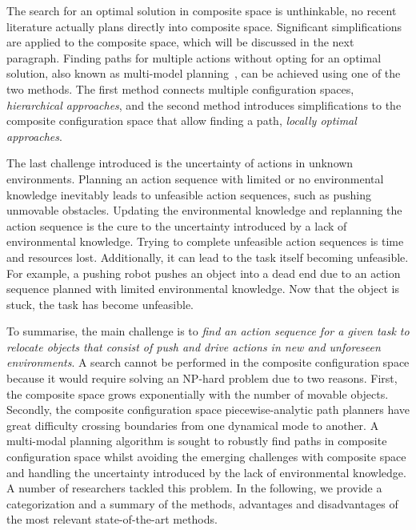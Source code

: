 The search for an optimal solution in composite space is unthinkable, no recent literature actually plans directly into composite space. Significant simplifications are applied to the composite space, which will be discussed in the next paragraph. Finding paths for multiple actions without opting for an optimal solution, also known as multi-model planning~\cite{hauser_multimodal_2010}, can be achieved using one of the two methods. The first method connects multiple configuration spaces, \textit{hierarchical approaches}, and the second method introduces simplifications to the composite configuration space that allow finding a path, \textit{locally optimal approaches}.\bs

The last challenge introduced is the uncertainty of actions in unknown environments. Planning an action sequence with limited or no environmental knowledge inevitably leads to unfeasible action sequences, such as pushing unmovable obstacles. Updating the environmental knowledge and replanning the action sequence is the cure to the uncertainty introduced by a lack of environmental knowledge. Trying to complete unfeasible action sequences is time and resources lost. Additionally, it can lead to the task itself becoming unfeasible. For example, a pushing robot pushes an object into a dead end due to an action sequence planned with limited environmental knowledge. Now that the object is stuck, the task has become unfeasible.\bs

To summarise, the main challenge is to \textit{find an action sequence for a given task to relocate objects that consist of push and drive actions in new and unforeseen environments}. A search cannot be performed in the composite configuration space because it would require solving an \ac{NP-hard} problem due to two reasons. First, the composite space grows exponentially with the number of movable objects. Secondly, the composite configuration space piecewise-analytic path planners have great difficulty crossing boundaries from one dynamical mode to another. A multi-modal planning algorithm is sought to robustly find paths in composite configuration space whilst avoiding the emerging challenges with composite space and handling the uncertainty introduced by the lack of environmental knowledge. A number of researchers tackled this problem. In the following, we provide a categorization and a summary of the methods, advantages and disadvantages of the most relevant state-of-the-art methods.\bs

